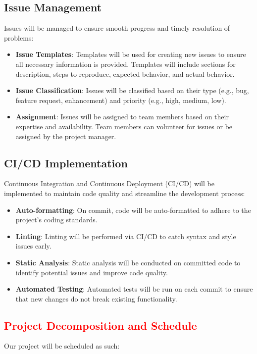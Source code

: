 \documentclass{article}
\begin{document}
\subsection{Issue Management}
Issues will be managed to ensure smooth progress and timely resolution of problems:
\begin{itemize}
    \item \textbf{Issue Templates}: Templates will be used for creating new issues to ensure all necessary information is provided. Templates will include sections for description, steps to reproduce, expected behavior, and actual behavior.
    \item \textbf{Issue Classification}: Issues will be classified based on their type (e.g., bug, feature request, enhancement) and priority (e.g., high, medium, low).
    \item \textbf{Assignment}: Issues will be assigned to team members based on their expertise and availability. Team members can volunteer for issues or be assigned by the project manager.
\end{itemize}

\subsection{CI/CD Implementation}
Continuous Integration and Continuous Deployment (CI/CD) will be implemented to maintain code quality and streamline the development process:
\begin{itemize}
    \item \textbf{Auto-formatting}: On commit, code will be auto-formatted to adhere to the project's coding standards.
    \item \textbf{Linting}: Linting will be performed via CI/CD to catch syntax and style issues early.
    \item \textbf{Static Analysis}: Static analysis will be conducted on committed code to identify potential issues and improve code quality.
    \item \textbf{Automated Testing}: Automated tests will be run on each commit to ensure that new changes do not break existing functionality.
\end{itemize}

\textcolor{red}{\section{Project Decomposition and Schedule}}

Our project will be scheduled as such: \\
\end{document}
